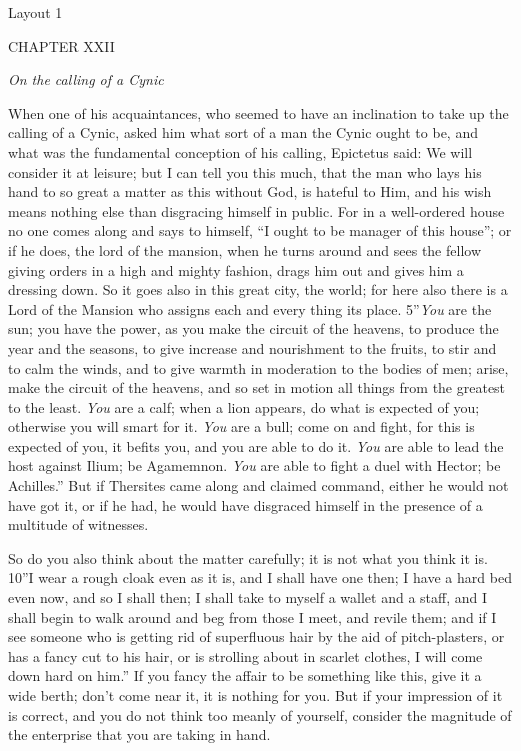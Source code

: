 
Layout 1

CHAPTER XXII

\emph{On the calling of a Cynic}

When one of his acquaintances, who seemed to have an inclination to take up the calling of a Cynic, asked him what sort of a man the Cynic ought to be, and what was the fundamental conception of his calling, Epictetus said: We will consider it at leisure; but I can tell you this much, that the man who lays his hand to so great a matter as this without God, is hateful to Him, and his wish means nothing else than disgracing himself in public. For in a well-ordered house no one comes along and says to himself, ``I ought to be manager of this house''; or if he does, the lord of the mansion, when he turns around and sees the fellow giving orders in a high and mighty fashion, drags him out and gives him a dressing down. So it goes also in this great city, the world; for here also there is a Lord of the Mansion who assigns each and every thing its place. 5''\emph{You} are the sun; you have the power, as you make the circuit of the heavens, to produce the year and the seasons, to give increase and nourishment to the fruits, to stir and to calm the winds, and to give warmth in moderation to the bodies of men; arise, make the circuit of the heavens, and so set in motion all things from the greatest to the least. \emph{You} are a calf; when a lion appears, do what is expected of you; otherwise you will smart for it. \emph{You} are a bull; come on and fight, for this is expected of you, it befits you, and you are able to do it. \emph{You} are able to lead the host against Ilium; be Agamemnon. \emph{You} are able to fight a duel with Hector; be Achilles.'' But if Thersites came along and claimed command, either he would not have got it, or if he had, he would have disgraced himself in the presence of a multitude of witnesses.

So do you also think about the matter carefully; it is not what you think it is. 10''I wear a rough cloak even as it is, and I shall have one then; I have a hard bed even now, and so I shall then; I shall take to myself a wallet and a staff, and I shall begin to walk around and beg from those I meet, and revile them; and if I see someone who is getting rid of superfluous hair by the aid of pitch-plasters, or has a fancy cut to his hair, or is strolling about in scarlet clothes, I will come down hard on him.'' If you fancy the affair to be something like this, give it a wide berth; don't come near it, it is nothing for you. But if your impression of it is correct, and you do not think too meanly of yourself, consider the magnitude of the enterprise that you are taking in hand.

